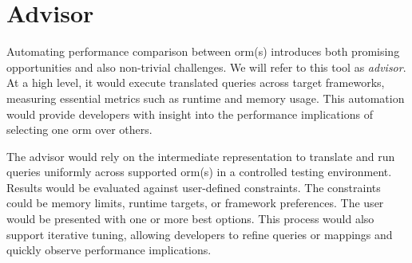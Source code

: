 \section{Advisor}
Automating performance comparison between \acrshort{orm}(s) introduces both promising opportunities and also non-trivial challenges. We will refer to this tool as \emph{advisor}. At a high level, it would execute translated queries across target frameworks, measuring essential metrics such as runtime and memory usage. This automation would provide developers with insight into the performance implications of selecting one \acrshort{orm} over others. 

The advisor would rely on the intermediate representation to translate and run queries uniformly across supported \acrshort{orm}(s) in a controlled testing environment. Results would be evaluated against user-defined constraints. The constraints could be memory limits, runtime targets, or framework preferences. The user would be presented with one or more best options. This process would also support iterative tuning, allowing developers to refine queries or mappings and quickly observe performance implications.